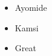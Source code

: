 \documentclass{article}
\begin{document}
	
	\begin{itemize}
		\item Ayomide
		\item Kamsi
		\item Great
	\end{itemize}
\end{document}
